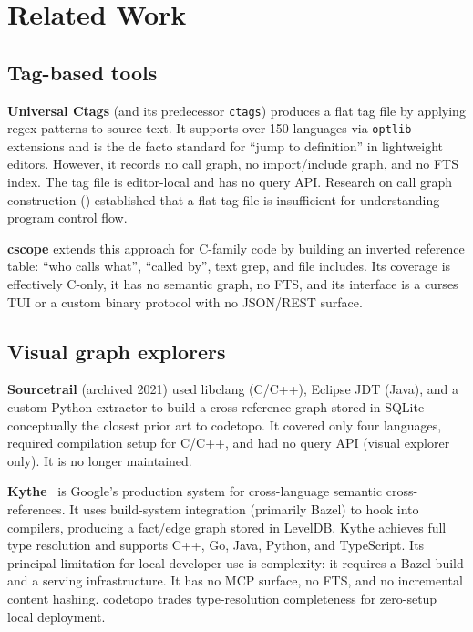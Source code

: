 \section{Related Work}
\label{sec:related-work}

\subsection{Tag-based tools}

\textbf{Universal Ctags} (and its predecessor \texttt{ctags}) produces a flat
tag file by applying regex patterns to source text. It supports over 150
languages via \texttt{optlib} extensions and is the de facto standard for
``jump to definition'' in lightweight editors. However, it records no call
graph, no import/include graph, and no FTS index. The tag file is editor-local
and has no query API. Research on call graph construction
(\cite{ryder1979callgraph}) established that a flat tag file is insufficient for
understanding program control flow.

\textbf{cscope} extends this approach for C-family code by building an
inverted reference table: ``who calls what'', ``called by'', text grep, and
file includes. Its coverage is effectively C-only, it has no semantic graph, no
FTS, and its interface is a curses TUI or a custom binary protocol with no
JSON/REST surface.

\subsection{Visual graph explorers}

\textbf{Sourcetrail} (archived 2021) used libclang (C/C++), Eclipse JDT (Java),
and a custom Python extractor to build a cross-reference graph stored in
SQLite --- conceptually the closest prior art to codetopo. It covered only four
languages, required compilation setup for C/C++, and had no query API (visual
explorer only). It is no longer maintained.

\textbf{Kythe}~\cite{google2014kythe} is Google's production system for
cross-language semantic cross-references. It uses build-system integration
(primarily Bazel) to hook into compilers, producing a fact/edge graph stored in
LevelDB. Kythe achieves full type resolution and supports C++, Go, Java, Python,
and TypeScript. Its principal limitation for local developer use is complexity:
it requires a Bazel build and a serving infrastructure. It has no MCP surface,
no FTS, and no incremental content hashing. codetopo trades type-resolution
completeness for zero-setup local deployment.

